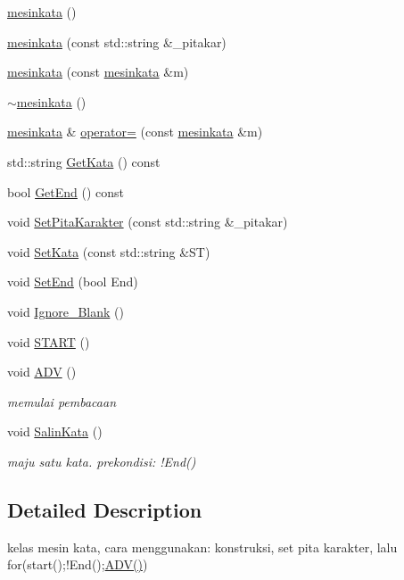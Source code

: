 \begin{DoxyCompactItemize}
\hyperlink{classmesinkata_a0ecf4ed898251dd6a05e11744090881e}{mesinkata} ()
\item 
\hyperlink{classmesinkata_a7cedc728dcc5bf339066dd2aae1c9f58}{mesinkata} (const std\-::string \&\-\_\-pitakar)
\item 
\hyperlink{classmesinkata_a0d221316d72f1bdfcdf4bd8eb11a5d91}{mesinkata} (const \hyperlink{classmesinkata}{mesinkata} \&m)
\item 
\hyperlink{classmesinkata_ad37a3e30b664e6092c0273c66148bf7d}{$\sim$mesinkata} ()
\item 
\hyperlink{classmesinkata}{mesinkata} \& \hyperlink{classmesinkata_ad9dd839515c249890f5209c6223a71b6}{operator=} (const \hyperlink{classmesinkata}{mesinkata} \&m)
\item 
std\-::string \hyperlink{classmesinkata_aa87c5d5fd7f0c45cce2244e3d80492e9}{Get\-Kata} () const 
\item 
bool \hyperlink{classmesinkata_a608feb73de0532ebcd4f3a079054b87d}{Get\-End} () const 
\item 
void \hyperlink{classmesinkata_ac09172015c4a048cb429198988a95472}{Set\-Pita\-Karakter} (const std\-::string \&\-\_\-pitakar)
\item 
void \hyperlink{classmesinkata_ab0628c8aa28428f280ddddc3fbbb5625}{Set\-Kata} (const std\-::string \&S\-T)
\item 
void \hyperlink{classmesinkata_ade4e0c75e5844ea47e8530a2b8ecacb9}{Set\-End} (bool End)
\item 
void \hyperlink{classmesinkata_a016945f311dfbb8c049dd5f9f6b0c852}{Ignore\-\_\-\-Blank} ()
\item 
void \hyperlink{classmesinkata_a9ce4e2f76886ae5674bdd02c395ad9c4}{S\-T\-A\-R\-T} ()
\item 
void \hyperlink{classmesinkata_aa9d334f1b013d6e2f23f791346561e76}{A\-D\-V} ()
\begin{DoxyCompactList}\small\item\em memulai pembacaan \end{DoxyCompactList}\item 
void \hyperlink{classmesinkata_a59ea3cc863b68a69bd728715242fef55}{Salin\-Kata} ()
\begin{DoxyCompactList}\small\item\em maju satu kata. prekondisi\-: !\-End() \end{DoxyCompactList}\end{DoxyCompactItemize}


\subsection{Detailed Description}
kelas mesin kata, cara menggunakan\-: konstruksi, set pita karakter, lalu for(start();!\-End();\hyperlink{classmesinkata_aa9d334f1b013d6e2f23f791346561e76}{A\-D\-V()}) 

